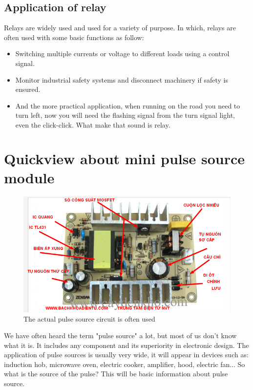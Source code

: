 \documentclass[a4paper]{report}
\begin{document}
    \subsection{Application of relay}
        Relays are widely used and used for a variety of purpose. In which, relays are often used 
        with some basic functions as follow:
        \begin{itemize}
            \item Switching multiple currents or voltage to different loads using a control signal.
            \item Monitor industrial safety systems and disconnect machinery if safety is ensured.
            \item And the more practical application, when running on the road you need to turn left, 
            now you will need the flashing signal from the turn signal light, even the click-click. What make that sound is relay.
        \end{itemize}
    \section{Quickview about mini pulse source module}
        \begin{figure}[ht]
            \centering 
            \includegraphics[width=\linewidth]{nguon xung.png}
            \caption{\label{fig:boat}The actual pulse source circuit is often used}
        \end{figure}
        We have often heard the term "pulse source" a lot, but most of us don't know what it is. 
        It includes any component and its superiority in electronic design. The application of pulse 
        sources is usually very wide, it will appear in devices such as: induction hob, microwave oven, 
        electric cooker, amplifier, hood, electric fan... So what is the source of the pulse? This will be 
        basic information about pulse source.
\end{document}
